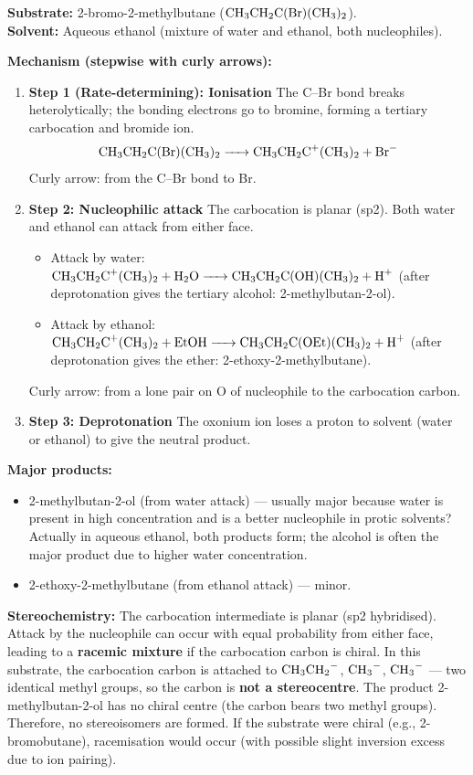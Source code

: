\documentclass[11pt]{article}
\begin{document}
\begin{corrige}
\textbf{Substrate:} 2-bromo-2-methylbutane (\(\ce{CH3CH2C(Br)(CH3)2}\)). \\
\textbf{Solvent:} Aqueous ethanol (mixture of water and ethanol, both nucleophiles).

\textbf{Mechanism (stepwise with curly arrows):}

\begin{enumerate}
\item \textbf{Step 1 (Rate-determining): Ionisation}
The C–Br bond breaks heterolytically; the bonding electrons go to bromine, forming a tertiary carbocation and bromide ion.
\[
\ce{CH3CH2C(Br)(CH3)2 -> CH3CH2C+(CH3)2 + Br-}
\]
Curly arrow: from the C–Br bond to Br.

\item \textbf{Step 2: Nucleophilic attack}
The carbocation is planar (sp2). Both water and ethanol can attack from either face.
\begin{itemize}
\item Attack by water: \(\ce{CH3CH2C+(CH3)2 + H2O -> CH3CH2C(OH)(CH3)2 + H+}\) (after deprotonation gives the tertiary alcohol: 2-methylbutan-2-ol).
\item Attack by ethanol: \(\ce{CH3CH2C+(CH3)2 + EtOH -> CH3CH2C(OEt)(CH3)2 + H+}\) (after deprotonation gives the ether: 2-ethoxy-2-methylbutane).
\end{itemize}
Curly arrow: from a lone pair on O of nucleophile to the carbocation carbon.

\item \textbf{Step 3: Deprotonation}
The oxonium ion loses a proton to solvent (water or ethanol) to give the neutral product.
\end{enumerate}

\textbf{Major products:} 
\begin{itemize}
\item 2-methylbutan-2-ol (from water attack) — usually major because water is present in high concentration and is a better nucleophile in protic solvents? Actually in aqueous ethanol, both products form; the alcohol is often the major product due to higher water concentration.
\item 2-ethoxy-2-methylbutane (from ethanol attack) — minor.
\end{itemize}

\textbf{Stereochemistry:} The carbocation intermediate is planar (sp2 hybridised). Attack by the nucleophile can occur with equal probability from either face, leading to a \textbf{racemic mixture} if the carbocation carbon is chiral. In this substrate, the carbocation carbon is attached to \(\ce{CH3CH2-}\), \(\ce{CH3-}\), \(\ce{CH3-}\) — two identical methyl groups, so the carbon is \textbf{not a stereocentre}. The product 2-methylbutan-2-ol has no chiral centre (the carbon bears two methyl groups). Therefore, no stereoisomers are formed. If the substrate were chiral (e.g., 2-bromobutane), racemisation would occur (with possible slight inversion excess due to ion pairing).
\end{corrige}
\end{document}
